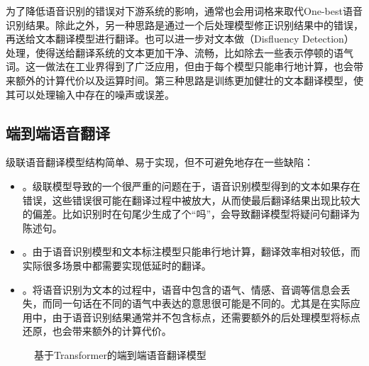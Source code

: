 \parinterval 为了降低语音识别的错误对下游系统的影响，通常也会用词格来取代One-best语音识别结果。除此之外，另一种思路是通过一个后处理模型修正识别结果中的错误，再送给文本翻译模型进行翻译。也可以进一步对文本做{\small{}}（Disfluency Detection）处理，使得送给翻译系统的文本更加干净、流畅，比如除去一些表示停顿的语气词。这一做法在工业界得到了广泛应用，但由于每个模型只能串行地计算，也会带来额外的计算代价以及运算时间。第三种思路是训练更加健壮的文本翻译模型，使其可以处理输入中存在的噪声或误差。


\subsection{端到端语音翻译}\label{end-to-end-speech-translation}

\parinterval 级联语音翻译模型结构简单、易于实现，但不可避免地存在一些缺陷：

\begin{itemize}
    \item {\small{}}。级联模型导致的一个很严重的问题在于，语音识别模型得到的文本如果存在错误，这些错误很可能在翻译过程中被放大，从而使最后翻译结果出现比较大的偏差。比如识别时在句尾少生成了个“吗”，会导致翻译模型将疑问句翻译为陈述句。
    \vspace{0.5em}
    \item {\small{}}。由于语音识别模型和文本标注模型只能串行地计算，翻译效率相对较低，而实际很多场景中都需要实现低延时的翻译。
    \vspace{0.5em}
    \item {\small{}}。将语音识别为文本的过程中，语音中包含的语气、情感、音调等信息会丢失，而同一句话在不同的语气中表达的意思很可能是不同的。尤其是在实际应用中，由于语音识别结果通常并不包含标点，还需要额外的后处理模型将标点还原，也会带来额外的计算代价。
\end{itemize}

\begin{figure}[htp]
\centering

\setlength{\abovecaptionskip}{-0.2em}
\caption{基于Transformer的端到端语音翻译模型}
\label{fig:17-7}
\end{figure}

